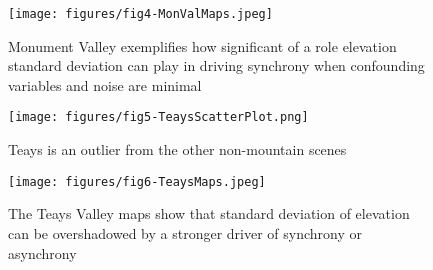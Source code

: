 \documentclass[letterpaper,11pt]{article}
\begin{document}
\begin{figure}[!h]
\texttt{[image: figures/fig4-MonValMaps.jpeg]}
\caption{Monument Valley exemplifies how significant of a role elevation standard deviation can play in driving synchrony when confounding variables and noise are minimal} \label{fig:fig4}
\end{figure}

\begin{figure}[!h]
\texttt{[image: figures/fig5-TeaysScatterPlot.png]}
\caption{Teays is an outlier from the other non-mountain scenes} \label{fig:fig5}
\end{figure}

\begin{figure}[!h]
\texttt{[image: figures/fig6-TeaysMaps.jpeg]}
\caption{The Teays Valley maps show that standard deviation of elevation can be overshadowed by a stronger driver of synchrony or asynchrony} \label{fig:fig6}
\end{figure}
\end{document}
